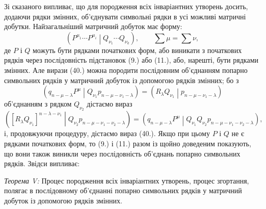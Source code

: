 \documentclass[11pt]{article}
\newcommand{\pair}[2]{\left(#1\middle|#2\right)}
\begin{document}
Зі сказаного випливає, що для породження всіх інваріантних утворень досить, додаючи рядки змінних, об'єднувати символьні рядки в усі можливі матричні добутки. Найзагальніший матричний добуток має форму:
\begin{equation}
 \pair{P^{\mu_1}\cdots P^{\mu_i}}{Q_{\nu_1}\cdots Q_{\nu_k}},
 \qquad \sum\mu=\sum\nu,
\tag{40}
\end{equation}
де $P$ і $Q$ можуть бути рядками початкових форм, або виникати з початкових рядків через послідовність підстановок (9.) або (11.), або, нарешті, бути рядками змінних. Але вирази (40.) можна породити послідовним об'єднанням попарно символьних рядків у матричний добуток із допомогою рядків змінних; бо з
\[
 \pair{q_{n-\mu-\lambda}P^\mu}{Q_{\nu_1}p_{n-\mu-\nu_1-\lambda}}
 =\pair{R_\lambda Q_{\nu_1}}{p_{n-\mu-\nu_1-\lambda}}
\]
об'єднанням з рядком $Q_{\nu_2}$ дістаємо вираз
\[
 \pair{[R_\lambda Q_{\nu_1}]^{n-\lambda-\nu_1}}
 {Q_{\nu_2}p_{n-\mu-\nu_1-\nu_2-\lambda}}
 =\pair{q_{n-\mu-\lambda}P^\mu}
 {Q_{\nu_1}Q_{\nu_2}p_{n-\mu-\nu_1-\nu_2-\lambda}},
\]
і, продовжуючи процедуру, дістаємо вираз (40.). Якщо при цьому $P$ і $Q$ не є рядками початкових форм, то (9.) і (11.) разом із щойно доведеним показують, що вони також виникли через послідовність об'єднань попарно символьних рядків. Звідси випливає:

\emph{Теорема V:} Процес породження всіх інваріантних утворень, процес згортання, полягає в послідовному об'єднанні попарно символьних рядків у матричний добуток із допомогою рядків змінних.
\end{document}
